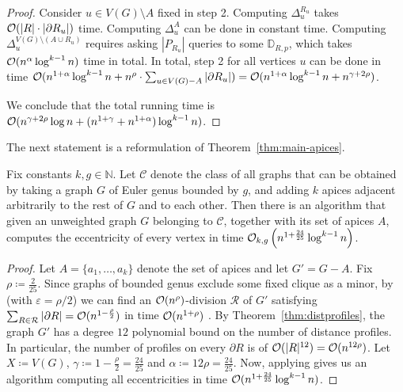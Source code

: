 \begin{proof}
    Consider $u \in V(G) \setminus A$ fixed in step 2. Computing $\Delta^{R_u}_u$ takes $\mathcal{O} (|R| \cdot |\partial R_u|)$ time. Computing $\Delta^{A}_u$ can be done in constant time. Computing $\Delta^{V(G) \setminus (A \cup R_u)}_u$ requires asking $|P_{R_u}|$ queries to some $\mathbb{D}_{R, p}$, which takes $\mathcal{O} (n^{\alpha} \log^{k - 1} n)$ time in total.
    In total, step 2 for all vertices $u$ can be done in time $\mathcal{O} (n^{1 + \alpha} \log^{k - 1} n + n^\rho \cdot \sum_{u \in V(G) - A} |\partial R_u|) = \mathcal{O} (n^{1 + \alpha} \log^{k - 1} n + n^{\gamma + 2\rho})$.
    
    We conclude that the total running time is $\mathcal{O}(n^{\gamma + 2\rho} \log n + (n^{1 + \gamma} + n^{1 + \alpha}) \log^{k - 1} n)$.
\end{proof}

The next statement is a reformulation of Theorem~\ref{thm:main-apices}. 

\begin{theorem}\label{t:main_bdgenus_apices}
Fix constants $k, g \in \mathbb{N}$. Let $\mathcal{C}$ denote the class of all graphs that can be obtained by taking a graph $G$ of Euler genus bounded by $g$, and adding $k$ apices adjacent arbitrarily to the rest of $G$ and to each other. Then there is an algorithm that given an unweighted graph $G$ belonging to $\mathcal{C}$, together with its set of apices $A$, computes the eccentricity of every vertex in time $\mathcal{O}_{k,g} \left( n^{1 + \frac{24}{25}} \log^{k - 1} n \right)$.
\end{theorem}

\begin{proof}
Let $A = \{a_1, \dots, a_k\}$ denote the set of apices and let $G' = G - A$. Fix $\rho\coloneqq \frac{2}{25}$.
Since graphs of bounded genus exclude some fixed clique as a minor,
by  (with $\varepsilon = \rho/2$)
we can find an $\mathcal{O}(n^\rho)$-division $\mathcal{R}$ of $G'$
satisfying $\sum_{R \in \mathcal{R}} |\partial R| = \mathcal{O} (n^{1 - \frac{\rho}{2}})$
in time $\mathcal{O}(n^{1 + \rho})$ .
By Theorem~\ref{thm:distprofiles}, the graph $G'$ has a degree $12$ polynomial bound on the number of distance profiles. In particular, the number of profiles on every $\partial R$ is of $\mathcal{O}(|R|^{12}) = \mathcal{O}(n^{12\rho})$. Let $X \coloneqq V(G)$, $\gamma \coloneqq 1 - \frac{\rho}{2} = \frac{24}{25}$ and $\alpha \coloneqq 12\rho = \frac{24}{25}$. Now,  applying  gives us an algorithm computing all eccentricities in time $\mathcal{O}(n^{1 + \frac{24}{25}} \log^{k - 1} n)$.
\end{proof}
